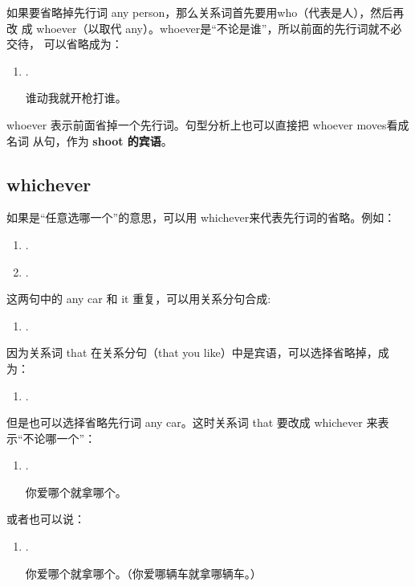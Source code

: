 如果要省略掉先行词 any person，那么关系词首先要用who（代表是人），然后再改
成 whoever（以取代 any）。whoever是“不论是谁”，所以前面的先行词就不必交待，
可以省略成为：
\begin{enumerate}[resume]
\item {}  .

  谁动我就开枪打谁。
\end{enumerate}
whoever 表示前面省掉一个先行词。句型分析上也可以直接把 whoever moves看成名词
从句，作为 \textbf{shoot 的宾语}。

\subsection{whichever}

如果是“任意选哪一个”的意思，可以用 whichever来代表先行词的省略。例如：

\begin{enumerate}
\item {}  .
\item {}  .
\end{enumerate}
这两句中的 any car 和 it 重复，可以用关系分句合成:
\begin{enumerate}[resume]
\item {}     .
\end{enumerate}
因为关系词 that 在关系分句（that you like）中是宾语，可以选择省略掉，成为：
\begin{enumerate}[resume]
\item {}   
  .
\end{enumerate}
但是也可以选择省略先行词 any car。这时关系词 that 要改成 whichever
来表示“不论哪一个”：
\begin{enumerate}[resume]
\item {}   
  .

  你爱哪个就拿哪个。
\end{enumerate}
或者也可以说：
\begin{enumerate}[resume]
\item {}   
  .

你爱哪个就拿哪个。（你爱哪辆车就拿哪辆车。）
\end{enumerate}

